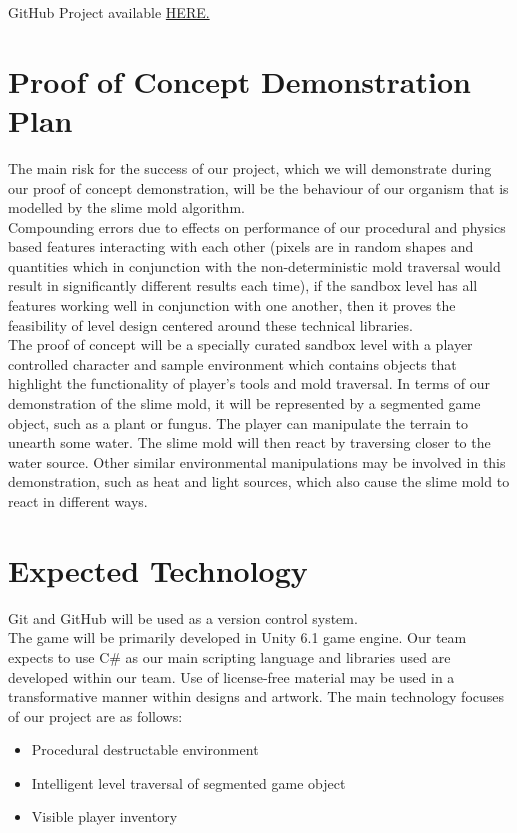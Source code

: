 \documentclass{article}
\begin{document}
GitHub Project available \href{https://github.com/users/felix-hurst/projects/2}{HERE.}

\section{Proof of Concept Demonstration Plan}

The main risk for the success of our project, which we will demonstrate during our proof of concept demonstration, will be the behaviour of our organism that is modelled by the slime mold algorithm.\\

Compounding errors due to effects on performance of our procedural and physics based features interacting with each other (pixels are in random shapes and quantities which in conjunction with the non-deterministic mold traversal would result in significantly different results each time), if the sandbox level has all features working well in conjunction with one another, then it proves the feasibility of level design centered around these technical libraries.\\

The proof of concept will be a specially curated sandbox level with a player controlled character and sample environment which contains objects that highlight the functionality of player’s tools and mold traversal. In terms of our demonstration of the slime mold, it will be represented by a segmented game object, such as a plant or fungus. The player can manipulate the terrain to unearth some water. The slime mold will then react by traversing closer to the water source. Other similar environmental manipulations may be involved in this demonstration, such as heat and light sources, which also cause the slime mold to react in different ways.\\


\section{Expected Technology}

Git and GitHub will be used as a version control system.\\

The game will be primarily developed in Unity 6.1 game engine. Our team expects to use C\# as our main scripting language and libraries used are developed within our team. Use of license-free material may be used in a transformative manner within designs and artwork. The main technology focuses of our project are as follows:
\begin{itemize}
\item{Procedural destructable environment}
\item{Intelligent level traversal of segmented game object}
\item{Visible player inventory}
\end{itemize}
\end{document}
